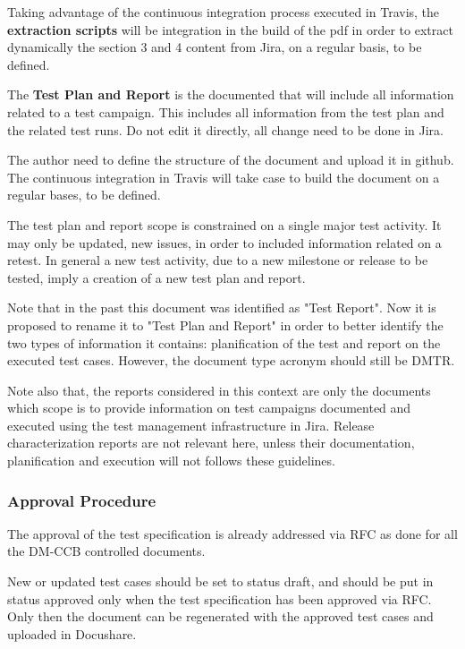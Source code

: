 Taking advantage of the continuous integration process executed in Travis, the {\bf extraction scripts} will be integration in the build of the pdf in order to extract dynamically the section 3 and 4 content from Jira, on a regular basis, to be defined.


The {\bf Test Plan and Report} is the documented that will include all information related to a test campaign. 
This includes all information from the test plan and the related test runs. 
Do not edit it directly, all change need to be done in Jira.

The author need to define the structure of the document and upload it in github. The continuous integration in Travis will take case to build the document on a regular bases, to be defined.

The test plan and report scope is constrained on a single major test activity. It may only be updated, new issues, in order to included information related on a retest.
In general a new test activity, due to a new milestone or release to be tested, imply a creation of a new test plan and report.

Note that in the past this document was identified as "Test Report".
Now it is proposed to rename it to "Test Plan and Report" in order to better identify the two types of information it contains: planification of the test and report on the executed test cases. However, the document type acronym should still be DMTR. 

Note also that, the reports considered in this context are only the documents which scope is to provide information on test campaigns documented and executed using the test management infrastructure in Jira. Release characterization reports are not relevant here, unless their documentation, planification and execution will not follows these guidelines.


\subsubsection{Approval Procedure}

The approval of the test specification is already addressed via RFC as done for all the DM-CCB controlled documents.

New or updated test cases should be set to status draft, and should be put in status approved only when the test specification has been approved via RFC.
Only then the document can be regenerated with the approved test cases and uploaded in Docushare.

